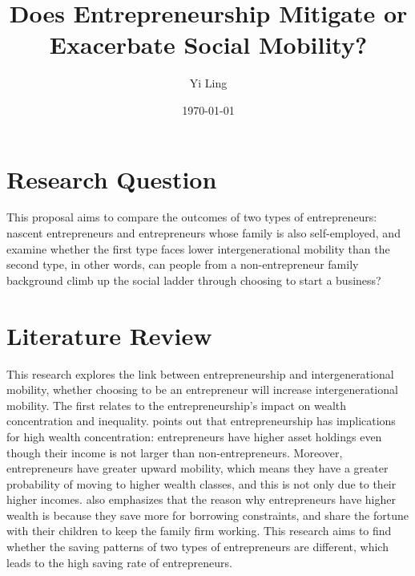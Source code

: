 



\title{\Large \textbf{Does Entrepreneurship Mitigate or Exacerbate Social Mobility? }}
\author{Yi Ling}

\date{\today}

\maketitle

\thispagestyle{empty} 
\doublespacing
\thispagestyle{empty} 

\section{Research Question}
This proposal aims to compare the outcomes of two types of entrepreneurs:  nascent entrepreneurs and entrepreneurs whose family is also self-employed, and examine whether the first type faces lower intergenerational mobility than the second type, in other words, can people from a non-entrepreneur family background climb up the social ladder through choosing to start a business?

\section{Literature Review}
This research explores the link between entrepreneurship and intergenerational mobility, whether choosing to be an entrepreneur will increase intergenerational mobility. The first relates to the entrepreneurship's impact on wealth concentration and inequality. \citet{quadrini1999importance} points out that entrepreneurship has implications for high wealth concentration: entrepreneurs have higher asset holdings even though their income is not larger than non-entrepreneurs. Moreover, entrepreneurs have greater upward mobility, which means they have a greater probability of moving to higher wealth classes, and this is not only due to their higher incomes. \citet{cagetti2006entrepreneurship} also emphasizes that the reason why entrepreneurs have higher wealth is because they save more for borrowing constraints, and share the fortune with their children to keep the family firm working. This research aims to find whether the saving patterns of two types of entrepreneurs are different, which leads to the high saving rate of entrepreneurs.


